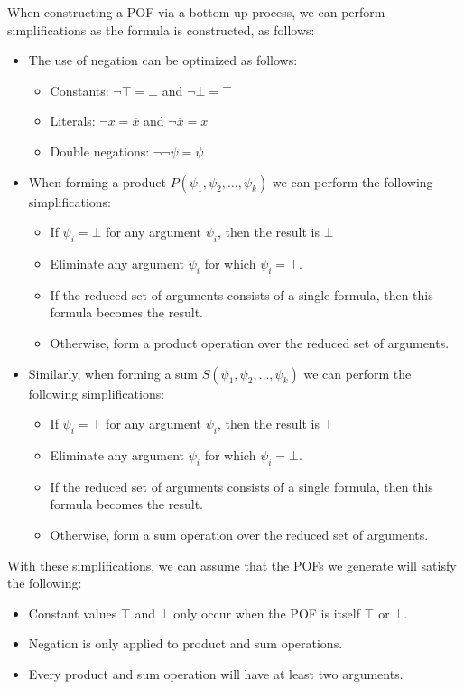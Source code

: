 \documentclass[letterpaper,USenglish,cleveref, autoref, thm-restate]{lipics-v2021}
\newcommand{\tautology}{\top}
\newcommand{\nil}{\bot}
\newcommand{\obar}[1]{\overline{#1}}
\begin{document}
When constructing a POF via a bottom-up process, we can perform simplifications as the formula is constructed, as follows:
\begin{itemize}
\item
The use of negation can be optimized as follows:
\begin{itemize}
\item Constants: $\neg \tautology = \nil$ and $\neg \nil = \tautology$
\item Literals: $\neg x = \obar{x}$ and $\neg \obar{x} = x$
\item Double negations: $\neg \neg \psi = \psi$
\end{itemize}

\item 
When forming a product $P(\psi_1, \psi_2, \ldots, \psi_k)$ we can perform the following simplifications:
\begin{itemize}
\item If $\psi_i = \nil$ for any argument $\psi_i$, then the result is $\nil$
\item Eliminate any argument $\psi_i$ for which $\psi_i = \tautology$.
\item If the reduced set of arguments consists of a single formula, then this formula becomes the result.
\item Otherwise, form a product operation over the reduced set of arguments.
\end{itemize}

\item
Similarly, when forming a sum $S(\psi_1, \psi_2, \ldots, \psi_k)$ we can perform the following simplifications:
\begin{itemize}
\item If $\psi_i = \tautology$ for any argument $\psi_i$, then the result is $\tautology$
\item Eliminate any argument $\psi_i$ for which $\psi_i = \nil$.
\item If the reduced set of arguments consists of a single formula, then this formula becomes the result.
\item Otherwise, form a sum operation over the reduced set of arguments.
\end{itemize}
\end{itemize}

With these simplifications, we can assume that the POFs we generate will satisfy the following:
\begin{itemize}
\item Constant values $\tautology$ and $\nil$ only occur when the POF is itself
  $\tautology$ or $\nil$.
\item Negation is only applied to product and sum operations.
\item Every product and sum operation will have at least two arguments.
\end{itemize}
\end{document}

